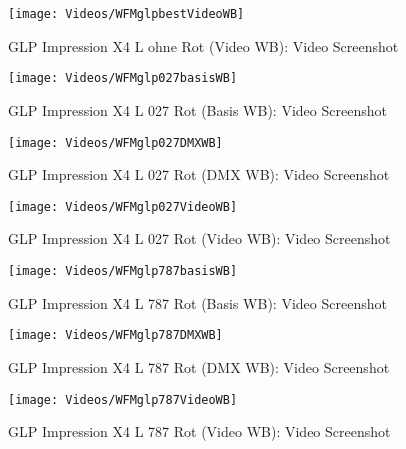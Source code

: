 \documentclass[pagesize,paper=A4,fontsize=12pt,utf8,numbers=noenddot,bibliography=totoc,listof=totoc,DIV=11,BCOR=1mm]{scrreprt}
\begin{document}
\begin{figure}[htp]     %
\centering
\texttt{[image: Videos/WFMglpbestVideoWB]} 
\caption {GLP Impression X4 L ohne Rot (Video WB): Video Screenshot} 
\end{figure}



\begin{figure}[htp]     %
\centering
\texttt{[image: Videos/WFMglp027basisWB]} 
\caption {GLP Impression X4 L 027 Rot (Basis WB): Video Screenshot} 
\end{figure}

\begin{figure}[htp]     %
\centering
\texttt{[image: Videos/WFMglp027DMXWB]} 
\caption {GLP Impression X4 L 027 Rot (DMX WB): Video Screenshot} 
\end{figure}

\begin{figure}[htp]     %
\centering
\texttt{[image: Videos/WFMglp027VideoWB]} 
\caption {GLP Impression X4 L 027 Rot (Video WB): Video Screenshot} 
\end{figure}



\begin{figure}[htp]     %
\centering
\texttt{[image: Videos/WFMglp787basisWB]} 
\caption {GLP Impression X4 L 787 Rot (Basis WB): Video Screenshot} 
\end{figure}

\begin{figure}[htp]     %
\centering
\texttt{[image: Videos/WFMglp787DMXWB]} 
\caption {GLP Impression X4 L 787 Rot (DMX WB): Video Screenshot} 
\end{figure}

\begin{figure}[htp]     %
\centering
\texttt{[image: Videos/WFMglp787VideoWB]} 
\caption {GLP Impression X4 L 787 Rot (Video WB): Video Screenshot} 
\end{figure}
\end{document}
